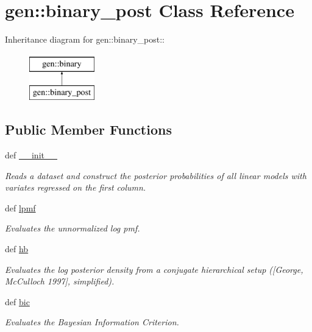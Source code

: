 \hypertarget{classgen_1_1binary__post}{
\section{gen::binary\_\-post Class Reference}
\label{classgen_1_1binary__post}
}
Inheritance diagram for gen::binary\_\-post::\begin{figure}[H]
\begin{center}
\leavevmode
\includegraphics[height=2cm]{classgen_1_1binary__post}
\end{center}
\end{figure}
\subsection*{Public Member Functions}
\begin{CompactItemize}
\item 
def \hyperlink{classgen_1_1binary__post_7069c5816dfa311016a8ea94494ae99f}{\_\-\_\-init\_\-\_\-}
\begin{CompactList}\small\item\em Reads a dataset and construct the posterior probabilities of all linear models with variates regressed on the first column. \item\end{CompactList}\item 
def \hyperlink{classgen_1_1binary__post_2ad20ce2b2b31381d879c8f83559f771}{lpmf}
\begin{CompactList}\small\item\em Evaluates the unnormalized log pmf. \item\end{CompactList}\item 
def \hyperlink{classgen_1_1binary__post_26a109b16742daa55d257a7678e156c3}{hb}
\begin{CompactList}\small\item\em Evaluates the log posterior density from a conjugate hierarchical setup (\mbox{[}George, McCulloch 1997\mbox{]}, simplified). \item\end{CompactList}\item 
def \hyperlink{classgen_1_1binary__post_f34f5b3a16fe5f6b90b61feac26a759c}{bic}
\begin{CompactList}\small\item\em Evaluates the Bayesian Information Criterion. \item\end{CompactList}\end{CompactItemize}

